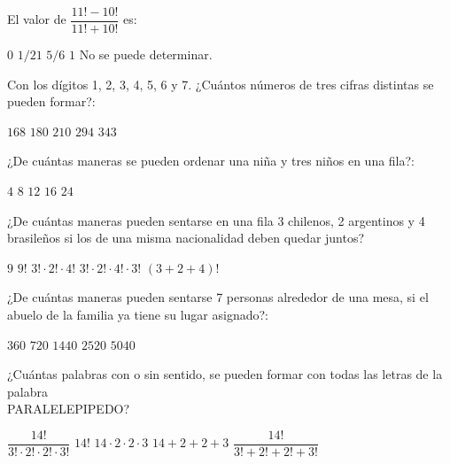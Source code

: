 \documentclass[]{srs}
\begin{document}
\begin{preguntas}[after-item-skip=2cm]
  \pregunta El valor de $\dfrac{11!-10!}{11!+10!}$ es: \\
  \begin{vertical}
    \alternativa $0$
    \alternativa $1/21$
    \alternativa $5/6$
    \alternativa $1$
    \alternativa No se puede determinar.

  \end{vertical}

  \pregunta Con los dígitos 1, 2, 3, 4, 5, 6 y 7. ¿Cuántos números de tres cifras distintas
  se pueden formar?: \\
  \begin{vertical}
    \alternativa $168$
    \alternativa $180$
    \alternativa $210$
    \alternativa $294$
    \alternativa $343$
  \end{vertical}

  \pregunta ¿De cuántas maneras se pueden ordenar una niña y tres niños en una fila?: \\
  \begin{vertical}
    \alternativa $4$
    \alternativa $8$
    \alternativa $12$
    \alternativa $16$
    \alternativa $24$
  \end{vertical}

  \pregunta ¿De cuántas maneras pueden sentarse en una fila 3 chilenos, 2 argentinos y
  4 brasileños si los de una misma nacionalidad deben quedar juntos? \\
  \begin{vertical}
    \alternativa $9$
    \alternativa $9!$
    \alternativa $3!\cdot 2!\cdot 4!$
    \alternativa $3!\cdot 2!\cdot 4!\cdot 3!$
    \alternativa $(3+2+4)!$
  \end{vertical}

  \pregunta ¿De cuántas maneras pueden sentarse 7 personas alrededor de una mesa, si
  el abuelo de la familia ya tiene su lugar asignado?: \\
  \begin{vertical}
    \alternativa $360$
    \alternativa $720$
    \alternativa $1440$
    \alternativa $2520$
    \alternativa $5040$
  \end{vertical}

  \pregunta ¿Cuántas palabras con o sin sentido, se pueden formar con todas las
  letras de la palabra \\\mbox{PARALELEPIPEDO}? \\
  \begin{vertical}
    \alternativa $\dfrac{14!}{3!\cdot 2!\cdot 2!\cdot 3!}$
    \alternativa $14!$
    \alternativa $14\cdot 2\cdot 2\cdot 3$
    \alternativa $14 + 2 + 2 + 3$
    \alternativa $\dfrac{14!}{3!+2!+2!+3!}$
  \end{vertical}


\end{preguntas}
\end{document}
